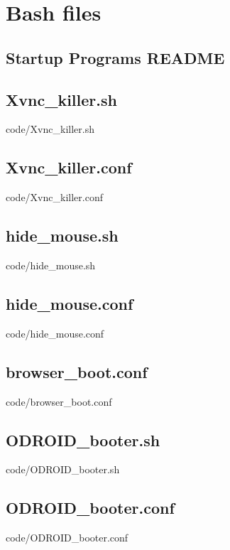 \section{Bash files}
\subsection{Startup Programs README}\label{app:bash_readme}
\scriptsize

\normalsize

\subsection{Xvnc\_killer.sh}\label{app:xvnc_killer}
\scriptsize
	 {code/Xvnc_killer.sh}
\normalsize

\subsection{Xvnc\_killer.conf}\label{app:xvnc_killer_conf}
\scriptsize
	 {code/Xvnc_killer.conf}
\normalsize

\subsection{hide\_mouse.sh}\label{app:hide_mouse}
\scriptsize
	 {code/hide_mouse.sh}
\normalsize

\subsection{hide\_mouse.conf}\label{app:hide_mouse_conf}
\scriptsize
	 {code/hide_mouse.conf}
\normalsize

\subsection{browser\_boot.conf}\label{app:browser_boot}
\scriptsize
	 {code/browser_boot.conf}
\normalsize

\subsection{ODROID\_booter.sh}\label{app:odroid_boot}
\scriptsize
	 {code/ODROID_booter.sh}
\normalsize

\subsection{ODROID\_booter.conf}\label{app:odroid_boot_conf}
\scriptsize
	 {code/ODROID_booter.conf}
\normalsize